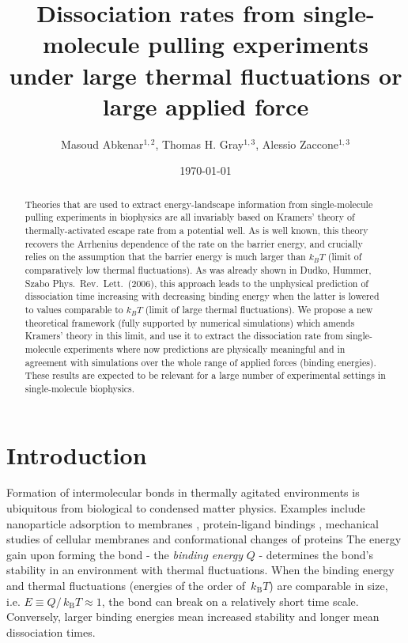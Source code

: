 \documentclass[twocolumn,pre,aps,showpacs,a4paper,floatfix,amssymb]{revtex4-1}
\newcommand{\kBT}{\,k_\mathrm{B}T}
\begin{document}
\date{\today}
\title{Dissociation rates from single-molecule pulling experiments under large thermal fluctuations or large applied force}
\author{Masoud Abkenar$^{1,2}$, Thomas H. Gray$^{1,3}$, Alessio Zaccone$^{1,3}$}

\begin{abstract}
Theories that are used to extract energy-landscape information from single-molecule pulling experiments in biophysics are all invariably based on Kramers' theory of thermally-activated escape rate from a potential well. As is well known, this theory recovers the Arrhenius dependence of the rate on the barrier energy, and crucially relies on the assumption that the barrier energy is much larger than $k_{B}T$ (limit of comparatively low thermal fluctuations). As was already shown in Dudko, Hummer, Szabo Phys.\ Rev.\ Lett.\ (2006), this approach leads to the unphysical prediction of dissociation time increasing with decreasing binding energy when the latter is lowered to values comparable to $k_{B}T$ (limit of large thermal fluctuations). We propose a new theoretical framework (fully supported by numerical simulations) which amends Kramers' theory in this limit, and use it to extract the dissociation rate from single-molecule experiments where now predictions are physically meaningful and in agreement with simulations over the whole range of applied forces (binding energies). These results are expected to be relevant for a large number of experimental settings in single-molecule biophysics. 
\end{abstract}

\maketitle

\section{Introduction}
Formation of intermolecular bonds in thermally agitated environments is ubiquitous from biological to condensed matter physics.
Examples include nanoparticle adsorption to membranes \cite{wilhelm2003intracellular,dasgupta1402}, 
protein-ligand bindings \cite{merkel1999energy,friddle2012interpreting,brujic2006single}, mechanical studies of cellular membranes \cite{evans1995sensitive,ramms2013keratins} and conformational changes of proteins \cite{yu2015}
The energy gain upon forming the bond - the \emph{binding energy} $Q$ - 
determines the bond's stability in an environment with thermal fluctuations.
When the binding energy and thermal fluctuations (energies of the order of $\kBT$) are comparable in size, i.e. $E\equiv Q/\kBT \approx 1$, the bond can break on a relatively short time scale. 
Conversely, larger binding energies mean increased stability and longer mean dissociation times.
\end{document}
